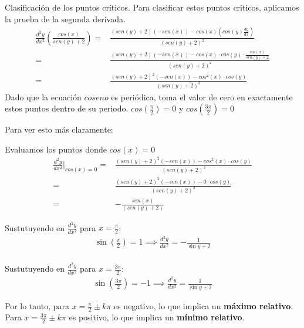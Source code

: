\vspace{-20px}
\noindent
Clasificación de los puntos críticos. Para clasificar estos puntos críticos, aplicamos la prueba de la segunda derivada.
\begin{align*}
	\frac{d^2y}{dx^2}\left(\frac{cos (x)}{sen(y)+2}\right)= & \frac{(sen(y)+2)\left(-sen(x)\right)-cos(x)\left(cos(y)\frac{dy}{dx}\right)}{\left(sen(y)+2\right)^2}         \\
	=                                                       & \frac{(sen(y)+2)\left(-sen(x)\right)-cos(x)\cdot cos(y)\cdot\frac{cos(x)}{sen(y)+2}}{\left(sen(y)+2\right)^2} \\
	=                                                       & \frac{(sen(y)+2)^2\left(-sen(x)\right)-cos^2(x)\cdot cos(y)}{\left(sen(y)+2\right)^3}
\end{align*}
Dado que la ecuación $coseno$ es periódica, toma el valor de cero en exactamente estos puntos dentro de su periodo.
$cos\left(\frac{\pi}{2}\right)=0$ y $cos\left(\frac{3\pi}{2}\right)=0$

Para ver esto más claramente:

Evaluamos los puntos donde $cos(x)=0$
\begin{align*}
	\frac{d^2y}{dx^2}\bigg|_{cos (x)=0}= & \frac{(sen(y)+2)^2\left(-sen(x)\right)-cos^2(x)\cdot cos(y)}{\left(sen(y)+2\right)^3} \\
	=                                          & \frac{(sen(y)+2)^2\left(-sen(x)\right)-0\cdot cos(y)}{\left(sen(y)+2\right)^3}                                     \\
	=                                          & -\frac{sen(x)}{\left(sen(y)+2\right)}                                          
\end{align*}
\vspace{-20px}
\begin{multicols}{2}
    Sustutuyendo en $\frac{d^2y}{dx^2}$ para $x=\frac{\pi}{2}$:
    \noindent
    \begin{align*}
        \sin\left(\frac{\pi}{2}\right) = 1 \implies \frac{d^2y}{dx^2} = -\frac{1}{\sin y + 2}
    \end{align*}
    \columnbreak\\
    Sustutuyendo en $\frac{d^2y}{dx^2}$ para $x=\frac{3\pi}{2}$:
    \begin{align*}
        \sin\left(\frac{3\pi}{2}\right) = -1 \implies \frac{d^2y}{dx^2} = \frac{1}{\sin y + 2}
    \end{align*}
\end{multicols}
\noindent
Por lo tanto, para $x = \frac{\pi}{2}\pm k\pi$ es negativo, lo que implica un \textbf{máximo relativo}.\\
Para $x = \frac{3\pi}{2}\pm k\pi$ es positivo, lo que implica un \textbf{mínimo relativo}.
